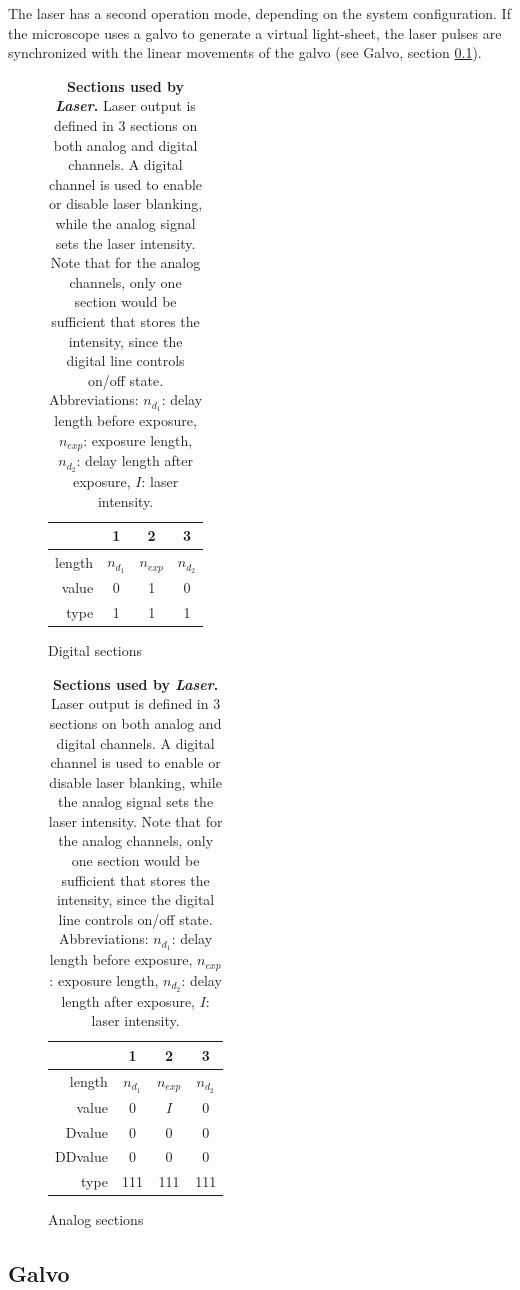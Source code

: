 \documentclass{tdk_style}
\begin{document}
The laser has a second operation mode, depending on the system configuration. If the microscope uses a galvo to generate a virtual light-sheet, the laser pulses are synchronized with the linear movements of the galvo (see Galvo, section \ref{galvo}).

\begin{table}[htb]
\centering
\begin{subfigure}[h]{0.49\textwidth}
\centering
\begin{tabular}{r|c|c|c}
			& 1 & 2 & 3\\ \hline \hline
	length  & $n_{d_1}$ & $n_{exp}$ & $n_{d_2}$ \\
	value   & 0 & 1 & 0  \\
	type  & 1 & 1 & 1\\
\end{tabular}
\caption{Digital sections}
\end{subfigure}
\begin{subfigure}[h]{0.490\textwidth}
\centering
\begin{tabular}{r|c|c|c}
			& 1 & 2 & 3\\ \hline \hline
	length  & $n_{d_1}$ & $n_{exp}$ & $n_{d_2}$ \\
	value   & 0 & $I$ & 0  \\
	Dvalue  & 0 & 0 & 0 \\
	DDvalue & 0 & 0 & 0 \\
	type    & 111 & 111 & 111 \\
\end{tabular}
\caption{Analog sections}
\end{subfigure}
\caption{\textbf{Sections used by \emph{Laser}.} Laser output is defined in 3 sections on both analog and digital channels. A digital channel is used to enable or disable laser blanking, while the analog signal sets the laser intensity. Note that for the analog channels, only one section would be sufficient that stores the intensity, since the digital line controls on/off state. Abbreviations: $n_{d_1}$: delay length before exposure, $n_{exp}$: exposure length, $n_{d_2}$: delay length after exposure, $I$: laser intensity.}
\label{tab:laser}
\end{table}




\subsection{Galvo}
\label{galvo}
\end{document}

